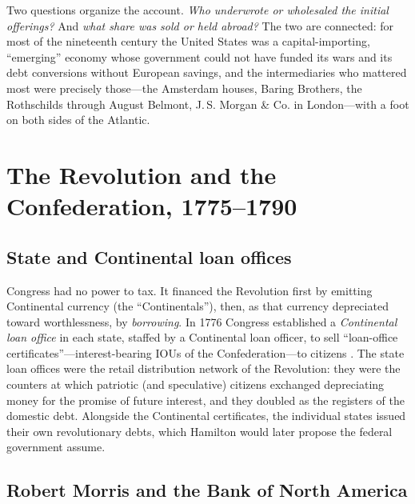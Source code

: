 \documentclass[12pt]{article}
\begin{document}
Two questions organize the account. \emph{Who underwrote or wholesaled the
initial offerings?} And \emph{what share was sold or held abroad?} The two are
connected: for most of the nineteenth century the United States was a
capital-importing, ``emerging'' economy whose government could not have funded
its wars and its debt conversions without European savings, and the
intermediaries who mattered most were precisely those---the Amsterdam houses,
Baring Brothers, the Rothschilds through August Belmont, J.\,S. Morgan \& Co.
in London---with a foot on both sides of the Atlantic.

\section{The Revolution and the Confederation, 1775--1790}

\subsection{State and Continental loan offices}

Congress had no power to tax. It financed the Revolution first by emitting
Continental currency (the ``Continentals''), then, as that currency
depreciated toward worthlessness, by \emph{borrowing}. In 1776 Congress
established a \emph{Continental loan office} in each state, staffed by a
Continental loan officer, to sell ``loan-office certificates''---interest-bearing
IOUs of the Confederation---to citizens \citep{ferguson1961power}. The state
loan offices were the retail distribution network of the Revolution: they were
the counters at which patriotic (and speculative) citizens exchanged
depreciating money for the promise of future interest, and they doubled as the
registers of the domestic debt. Alongside the Continental certificates, the
individual states issued their own revolutionary debts, which Hamilton would
later propose the federal government assume.

\subsection{Robert Morris and the Bank of North America}
\end{document}
